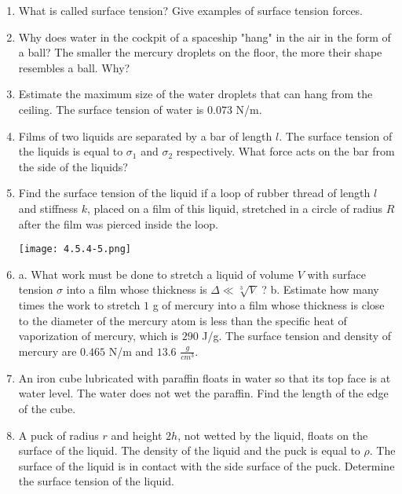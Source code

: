 \documentclass{article}
\begin{document}
\begin{enumerate}[label=4.5.\arabic*]


\item What is called surface tension? Give examples of surface tension forces.

\item Why does water in the cockpit of a spaceship "hang" in the air in the form of a ball? The smaller the mercury droplets on the floor, the more their shape resembles a ball. Why?

\item Estimate the maximum size of the water droplets that can hang from the ceiling. The surface tension of water is $0.073$ N/m.   

\item Films of two liquids are separated by a bar of length $l$. The surface tension of the liquids is equal to $\sigma_1$ and $\sigma_2$ respectively. What force acts on the bar from the side of the liquids?  

\item Find the surface tension of the liquid if a loop of rubber thread of length $l$ and stiffness $k$, placed on a film of this liquid, stretched in a circle of radius $R$ after the film was pierced inside the loop.

\begin{center}
    \texttt{[image: 4.5.4-5.png]}
\end{center}

\item a. What work must be done to stretch a liquid of volume $V$ with surface tension $\sigma$ into a film whose thickness is $\Delta \ll \sqrt[3]{V}$ ? 
b. Estimate how many times the work to stretch $1$ g of mercury into a film whose thickness is close to the diameter of the mercury atom is less than the specific heat of vaporization of mercury, which is $290$ J/g. The surface tension and density of mercury are $0.465$ N/m and $13.6$ $\frac{g}{cm^3}$.



\item An iron cube lubricated with paraffin floats in water so that its top face is at water level. The water does not wet the paraffin. Find the length of the edge of the cube.

\item A puck of radius $r$ and height $2h$, not wetted by the liquid, floats on the surface of the liquid. The density of the liquid and the puck is equal to $\rho$. The surface of the liquid is in contact with the side surface of the puck. Determine the surface tension of the liquid.


\end{enumerate}
\end{document}
